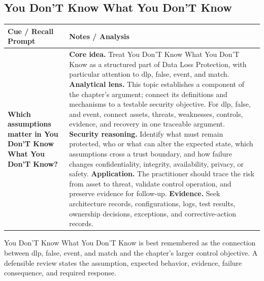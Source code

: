 \documentclass[11pt]{article}
\newcommand{\CornellHeader}{%
\rowcolor{Navy}\color{white}\bfseries Cue / Recall Prompt & \color{white}\bfseries Notes / Analysis\\\hline}
\newcommand{\CornellRow}[2]{%
\cellcolor{CueGray}\RaggedRight\textbf{#1} & \RaggedRight #2\\\hline}
\begin{document}
\subsection*{You Don'T Know What You Don'T Know}
\begin{longtable}{>{\RaggedRight\arraybackslash}p{}|>{\RaggedRight\arraybackslash}p{}}
\CornellHeader
\CornellRow{Which assumptions matter in You Don'T Know What You Don'T Know?}{\textbf{Core idea.} Treat You Don'T Know What You Don'T Know as a structured part of Data Loss Protection, with particular attention to dlp, false, event, and match. \textbf{Analytical lens.} This topic establishes a component of the chapter's argument; connect its definitions and mechanisms to a testable security objective. For dlp, false, and event, connect assets, threats, weaknesses, controls, evidence, and recovery in one traceable argument. \textbf{Security reasoning.} Identify what must remain protected, who or what can alter the expected state, which assumptions cross a trust boundary, and how failure changes confidentiality, integrity, availability, privacy, or safety. \textbf{Application.} The practitioner should trace the risk from asset to threat, validate control operation, and preserve evidence for follow-up. \textbf{Evidence.} Seek architecture records, configurations, logs, test results, ownership decisions, exceptions, and corrective-action records.}
\end{longtable}
\begin{topicsummary}
You Don'T Know What You Don'T Know is best remembered as the connection between dlp, false, event, and match and the chapter's larger control objective. A defensible review states the assumption, expected behavior, evidence, failure consequence, and required response.
\end{topicsummary}
\end{document}
